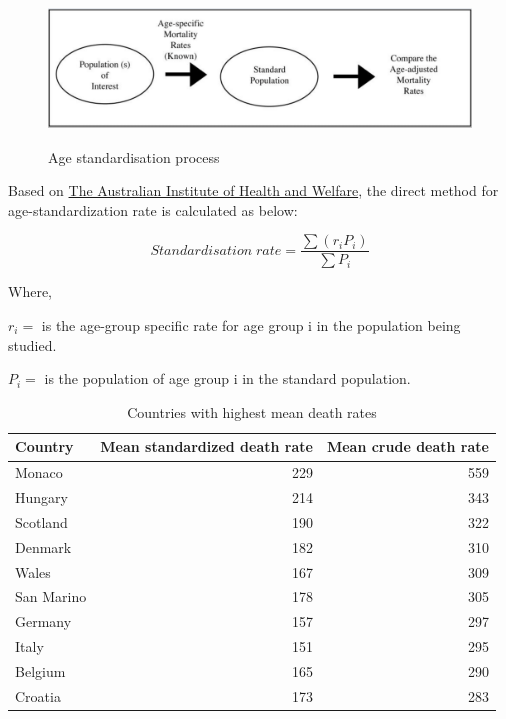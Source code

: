 \documentclass[11pt,a4paper,]{article}
\begin{document}
\begin{figure}
\includegraphics[width=450px,height=150px]{figs/image2} \caption{Age standardisation process}\label{fig:unnamed-chunk-1}
\end{figure}

Based on \href{https://meteor.aihw.gov.au/content/327276}{The Australian Institute of Health and Welfare}, the direct method for age-standardization rate is calculated as below:

\[Standardisation\;rate = \frac{\sum(r_iP_i)}{\sum{P_i}}\]

Where,

\(r_i =\) is the age-group specific rate for age group i in the population being studied.

\(P_i =\) is the population of age group i in the standard population.

\begin{table}

\caption{\label{tab:ratecalc}Countries with highest mean death rates}
\centering
\begin{tabular}[t]{lrr}
\toprule
Country & Mean standardized death rate & Mean crude death rate\\
\midrule
Monaco & 229 & 559\\
Hungary & 214 & 343\\
Scotland & 190 & 322\\
Denmark & 182 & 310\\
Wales & 167 & 309\\
\addlinespace
San Marino & 178 & 305\\
Germany & 157 & 297\\
Italy & 151 & 295\\
Belgium & 165 & 290\\
Croatia & 173 & 283\\
\bottomrule
\end{tabular}
\end{table}
\end{document}
